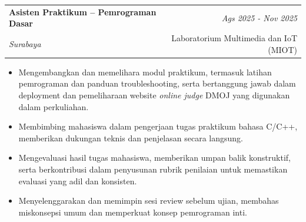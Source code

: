\documentclass[a4paper,11pt]{article}
\makeatletter
\newcommand{\resumeSubheading}[4]{
\vspace{0.5mm}\item
    \begin{tabular*}{0.98\textwidth}[t]{l@{\extracolsep{\fill}}r}
        \textbf{#1} & \textit{\footnotesize{#4}} \\
        \textit{\footnotesize{#3}} &  \footnotesize{#2}\\
    \end{tabular*}
    \vspace{-2.4mm}
}
\newcommand{\resumeItemListStart}{\begin{justify}\begin{itemize}[leftmargin=3ex, rightmargin=2ex, noitemsep,labelsep=1.2mm,itemsep=0mm]\small}
\newcommand{\resumeItemListEnd}{\end{itemize}\end{justify}\vspace{-2mm}}
\makeatother
\begin{document}
\resumeSubheading
{Asisten Praktikum – Pemrograman Dasar}{Laboratorium Multimedia dan IoT (MIOT)}
{Surabaya}{Ags 2025 - Nov 2025}
\resumeItemListStart
\item {Mengembangkan dan memelihara modul praktikum, termasuk latihan pemrograman dan panduan troubleshooting, serta bertanggung jawab dalam deployment dan pemeliharaan website \textit{online judge} DMOJ yang digunakan dalam perkuliahan.}
\item {Membimbing mahasiswa dalam pengerjaan tugas praktikum bahasa C/C++, memberikan dukungan teknis dan penjelasan secara langsung.}
\item {Mengevaluasi hasil tugas mahasiswa, memberikan umpan balik konstruktif, serta berkontribusi dalam penyusunan rubrik penilaian untuk memastikan evaluasi yang adil dan konsisten.}
\item {Menyelenggarakan dan memimpin sesi review sebelum ujian, membahas miskonsepsi umum dan memperkuat konsep pemrograman inti.}
\resumeItemListEnd
\vspace{-2mm}

\end{document}
